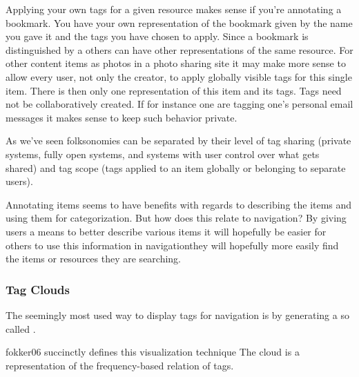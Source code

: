 Applying your own tags for a given resource makes sense if you're annotating a
bookmark. You have your own representation of the bookmark given by the name
you gave it and the tags you have chosen to apply. Since a bookmark is
distinguished by a  others can have other representations of the
same resource. For other content items as photos in a photo sharing site it
may make more sense to allow every user, not only the creator, to apply
globally visible tags for this single item. There is then only one
representation of this item and its tags.
Tags need not be collaboratively created. If for instance one are tagging
one's personal email messages it makes sense to keep such behavior private.

As we've seen folksonomies can be separated by their level of tag sharing
(private systems, fully open systems, and systems with user control over
what gets shared) and tag scope (tags applied to an item globally
or belonging to separate users).%

Annotating items seems to have benefits with regards to describing the items
and using them for categorization. But how does this relate to navigation?
By giving users a means to better describe various items it will hopefully be
easier for others to use this information in navigation\dash{}they will
hopefully more easily find the items or resources they are searching.

\subsubsection{Tag Clouds}

The seemingly most used way to display tags for navigation is by generating
a so called .%
\begin{fullquote}[\p{1}]{fokker06}{%
  succinctly defines this visualization technique}
    The cloud is a representation of the frequency-based relation of tags.
\end{fullquote}

